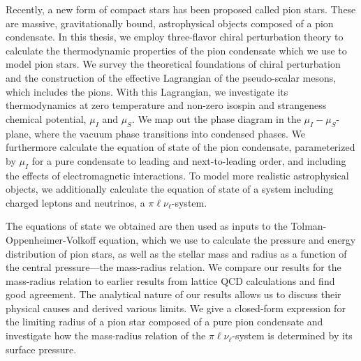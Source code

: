 \vspace*{1.5cm}
Recently, a new form of compact stars has been proposed called pion stars.
These are massive, gravitationally bound, astrophysical objects composed of a pion condensate.
In this thesis, we employ three-flavor chiral perturbation theory to calculate the thermodynamic properties of the pion condensate which we use to model pion stars.
We survey the theoretical foundations of chiral perturbation and the construction of the effective Lagrangian of the pseudo-scalar mesons, which includes the pions.
With this Lagrangian, we investigate its thermodynamics at zero temperature and non-zero isospin and strangeness chemical potential, $\mu_I$ and $\mu_S$.
We map out the phase diagram in the $\mu_I-\mu_S$-plane, where the vacuum phase transitions into condensed phases.
We furthermore calculate the equation of state of the pion condensate, parameterized by $\mu_I$ for a pure condensate to leading and next-to-leading order, and including the effects of electromagnetic interactions.
To model more realistic astrophysical objects, we additionally calculate the equation of state of a system including charged leptons and neutrinos, a $\pi\ell\nu_\ell$-system.


The equations of state we obtained are then used as inputs to the Tolman-Oppenheimer-Volkoff equation, which we use to calculate the pressure and energy distribution of pion stars, as well as the stellar mass and radius as a function of the central pressure---the mass-radius relation.
We compare our results for the mass-radius relation to earlier results from lattice QCD calculations and find good agreement.
The analytical nature of our results allows us to discuss their physical causes and derived various limits.
We give a closed-form expression for the limiting radius of a pion star composed of a pure pion condensate and investigate how the mass-radius relation of the $\pi\ell\nu_\ell$-system is determined by its surface pressure.


